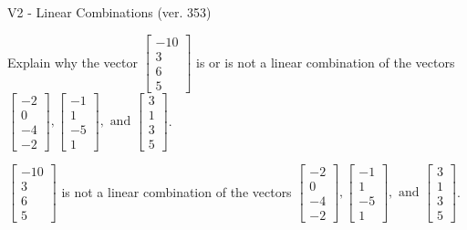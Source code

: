 \begin{exercise}
  \begin{exerciseTitle}V2 - Linear Combinations (ver. 353)\end{exerciseTitle}
  \begin{exerciseStatement}
    Explain why the vector \(\left[\begin{array}{c}
-10 \\
3 \\
6 \\
5
\end{array}\right]\)  is or is not a linear 
	combination of the vectors \(\left[\begin{array}{c}
-2 \\
0 \\
-4 \\
-2
\end{array}\right] , \left[\begin{array}{c}
-1 \\
1 \\
-5 \\
1
\end{array}\right] , \text{ and } \left[\begin{array}{c}
3 \\
1 \\
3 \\
5
\end{array}\right]\).
	


  \end{exerciseStatement}
  \begin{exerciseAnswer}
   \(\left[\begin{array}{c}
-10 \\
3 \\
6 \\
5
\end{array}\right]\) 
  	 is not  
	a linear combination of the vectors \(\left[\begin{array}{c}
-2 \\
0 \\
-4 \\
-2
\end{array}\right] , \left[\begin{array}{c}
-1 \\
1 \\
-5 \\
1
\end{array}\right] , \text{ and } \left[\begin{array}{c}
3 \\
1 \\
3 \\
5
\end{array}\right]\).

	
  


  \end{exerciseAnswer}
\end{exercise}